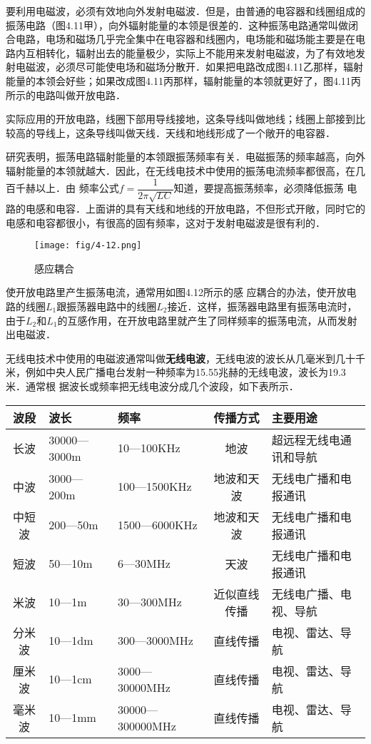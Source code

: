 要利用电磁波，必须有效地向外发射电磁波．但是，由普通的电容器和线圈组成的振荡电路（图4.11甲），向外辐射能量的本领是很差的．这种振荡电路通常叫做闭合电路，电场和磁场几乎完全集中在电容器和线圈内，电场能和磁场能主要是在电路内互相转化，辐射出去的能量极少，实际上不能用来发射电磁波，为了有效地发射电磁波，必须尽可能使电场和磁场分散开．如果把电路改成图4.11乙那样，辐射能量的本领会好些；如果改成图4.11丙那样，辐射能量的本领就更好了，图4.11丙所示的电路叫做开放电路．

实际应用的开放电路，线圈下部用导线接地，这条导线叫做地线；线圈上部接到比较高的导线上，这条导线叫做天线．天线和地线形成了一个敞开的电容器．

研究表明，振荡电路辐射能量的本领跟振荡频率有关．电磁振荡的频率越高，向外辐射能量的本领就越大．因此，在无线电技术中使用的振荡电流频率都很高，在几百千赫以上．由
频率公式$f=\dfrac{1}{2\pi\sqrt{LC}}$知道，要提高振荡频率，必须降低振荡
电路的电感和电容．上面讲的具有天线和地线的开放电路，不但形式开敞，同时它的电感和电容都很小，有很高的固有频率，这对于发射电磁波是很有利的．
\begin{figure}[htp]\centering
\texttt{[image: fig/4-12.png]}
\caption{感应耦合}
\end{figure}

使开放电路里产生振荡电流，通常用如图4.12所示的感
应耦合的办法，使开放电路的线圈$L_1$跟振荡器电路中的线圈$L_2$接近．这样，振荡器电路里有振荡电流时，由于$L_2$和$L_1$的互感作用，在开放电路里就产生了同样频率的振荡电流，从而发射出电磁波．

无线电技术中使用的电磁波通常叫做\textbf{无线电波}，无线电波的波长从几毫米到几十千米，例如中央人民广播电台发射一种频率为15.55兆赫的无线电波，波长为19.3米．通常根
据波长或频率把无线电波分成几个波段，如下表所示．

\begin{center}
\begin{tabular}{cp{}p{}cp{}}
	\hline
	波段  &  波长  & 频率 & 传播方式 & 主要用途
\\
\hline
长波    &  30000—3000m  & 10—100KHz   &地波    & 超远程无线电通讯和导航\\
中波   & 3000—200m   & 100—1500KHz   & 地波和天波   & 无线电广播和电报通讯\\
中短波   & 200—50m   & 1500—6000KHz  & 地波和天波   & 无线电广播和电报通讯\\
短波 & 50—10m   & 6—30MHz & 天波   & 无线电广播和电报通讯\\
米波 & 10—1m   & 30—300MHz   & 近似直线传播   &  无线电广播、电视、导航\\
分米波 & 10—1dm   & 300—3000MHz   & 直线传播   &  电视、雷达、导航\\  
厘米波& 10—1cm   &  3000—30000MHz   & 直线传播   &  电视、雷达、导航\\ 
毫米波 & 10—1mm 
  & 30000—300000MHz   & 直线传播   &  电视、雷达、导航\\
\hline
\end{tabular}

\end{center}


